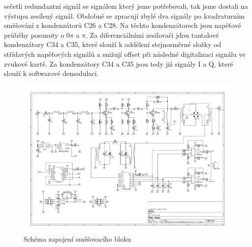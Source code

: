 sečetli redundantní signál se signálem který jsme potřebovali, tak jsme dostali na výstupu zesílený signál. Obdobně se zpracují zbylé dva signály po kvadraturním směšování z kondenzátorů C26 a C28. Na těchto kondenzátorech jsou napěťové průběhy posunuty o $0\pi$ a $\pi$. Za diferenciálními zesilovači jdou tantalové kondenzátory C34 a C35, které slouží k oddělení stejnosměrné složky od střídavých napěťových signálů a snižují  offset při následné digitalizaci signálu ve zvukové kartě. Za kondenzátory C34 a C35 jsou tedy již signály I a Q, které slouží k softwarové demodulaci.

\begin{landscape}
	\begin{figure}[h]
		\centering 	
		\includegraphics[height=\textwidth]{img/mix/sch.pdf}
		\caption{Schéma zapojení směšovacího bloku}	
	\end{figure}
\end{landscape}
%

